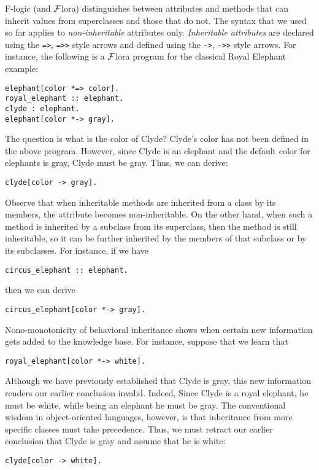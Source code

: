 \documentclass[11pt]{article}
\newcommand{\FLORA}{{\mbox{${\cal F}${\sc lora}}}\xspace}
\begin{document}
F-logic (and \FLORA) distinguishes between attributes and methods that can
inherit values from superclasses and those that do not. The syntax that we
used so far applies to \emph{non-inheritable} attributes only.
\emph{Inheritable attributes} are declared using the {\tt *=>}, {\tt *=>>}
style arrows and defined using the {\tt *->}, {\tt *->>} style arrows. For
instance, the following is a \FLORA program for the classical Royal
Elephant example:
\begin{verbatim}
elephant[color *=> color].
royal_elephant :: elephant.
clyde : elephant.
elephant[color *-> gray].
\end{verbatim}
The question is what is the color of Clyde?
Clyde's color has not been defined in the above program. However, since
Clyde is an elephant and the default color for elephants is gray, Clyde
must be gray. Thus, we can derive:
\begin{verbatim}
clyde[color -> gray].  
\end{verbatim}
Observe that when inheritable methods are inherited from a class by its
members, the attribute becomes non-inheritable. On the other hand, when
such a method is inherited by a subclass from its superclass, then the
method is still inheritable, so it can be further inherited by the members
of that subclass or by its subclasses. For instance, if we have
\begin{verbatim}
circus_elephant :: elephant.
\end{verbatim}
then we can derive 
\begin{verbatim}
circus_elephant[color *-> gray].  
\end{verbatim}

Nono-monotonicity of behavioral inheritance shows when certain new
information gets added to the knowledge base. For instance, suppose that we
learn that
\begin{verbatim}
royal_elephant[color *-> white].  
\end{verbatim}
Although we have previously established that Clyde is gray, this new
information renders our earlier conclusion invalid. Indeed,
Since Clyde is a royal elephant, he must be white, while being an elephant
he must be gray.
The conventional wisdom in object-oriented languages, however, is that
inheritance from more specific classes must take precedence. Thus, we must
retract our earlier conclusion that Clyde is gray and assume that he is white:
\begin{verbatim}
clyde[color -> white].    
\end{verbatim}
\end{document}
